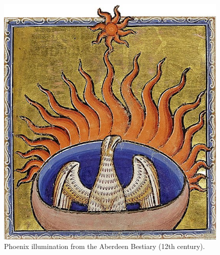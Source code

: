 \documentclass[
]{book}
\begin{document}
\begin{figure}

{\centering \includegraphics[width=\textwidth]{img/phoenix_aberdeen_bestiary} 

}

\caption{Phoenix illumination from the Aberdeen Bestiary (12th century).}\label{fig:unnamed-chunk-18}
\end{figure}

  
\end{document}
